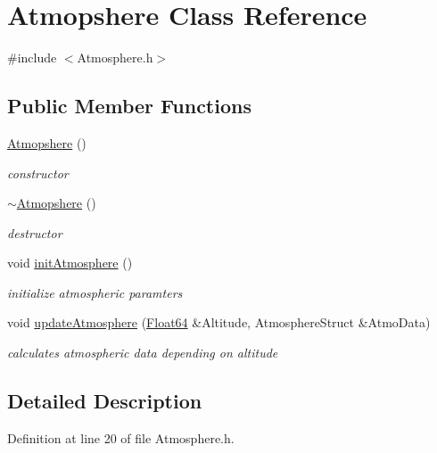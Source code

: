 \hypertarget{class_atmopshere}{}\section{Atmopshere Class Reference}
\label{class_atmopshere}


{\ttfamily \#include $<$Atmosphere.\+h$>$}

\subsection*{Public Member Functions}
\begin{DoxyCompactItemize}
\item 
\hyperlink{class_atmopshere_a77ca553d3c4e855dd921a451d65cc313}{Atmopshere} ()
\begin{DoxyCompactList}\small\item\em constructor \end{DoxyCompactList}\item 
\hyperlink{class_atmopshere_ac7815ca8008ed54dc758f2bf7a6104f7}{$\sim$\+Atmopshere} ()
\begin{DoxyCompactList}\small\item\em destructor \end{DoxyCompactList}\item 
void \hyperlink{class_atmopshere_a6e1d5763fbb6631784c99ee3c88911bd}{init\+Atmosphere} ()
\begin{DoxyCompactList}\small\item\em initialize atmospheric paramters \end{DoxyCompactList}\item 
void \hyperlink{class_atmopshere_a2bd97471d32725d6196ee6816ea36c99}{update\+Atmosphere} (\hyperlink{group___tools_ga3f1431cb9f76da10f59246d1d743dc2c}{Float64} \&Altitude, Atmosphere\+Struct \&Atmo\+Data)
\begin{DoxyCompactList}\small\item\em calculates atmospheric data depending on altitude \end{DoxyCompactList}\end{DoxyCompactItemize}


\subsection{Detailed Description}


Definition at line 20 of file Atmosphere.\+h.



